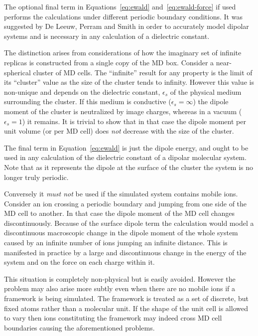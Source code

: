 \documentclass[11pt]{article}
\begin{document}
The optional final term in Equations~\ref{eq:ewald} 
and~\ref{eq:ewald-force} if used performs the calculations under
different periodic boundary conditions.  It was suggested by De Leeuw,
Perram and Smith\cite{} in order to accurately model
dipolar systems and is necessary in any calculation of a dielectric
constant. 

The distinction arises from considerations of how the imaginary set of
infinite replicas is constructed from a single copy of the MD 
box\cite[pp 156-159]{}.  Consider a near-spherical cluster
of MD cells.  The ``infinite'' result for any property is the limit of
its ``cluster'' value as the size of the cluster tends to infinity.
However this value is non-unique and depends on the dielectric
constant, $\epsilon_s$ of the physical medium surrounding the cluster.
If this medium is conductive ($\epsilon_s=\infty$) the dipole
moment of the cluster is neutralized by image charges, whereas in a
vacuum ($\epsilon_s=1$) it remains.  It is trivial to show that
in that case the dipole moment per unit volume (or per MD cell) does
\emph{not} decrease with the size of the cluster.

The final term in Equation~\ref{eq:ewald} is just the dipole energy,
and ought to be used in any calculation of the dielectric constant of
a dipolar molecular system.   Note that as it represents the
dipole at the surface of the cluster the system is no longer truly
periodic.

Conversely it \emph{must not} be used if the simulated system contains
mobile ions.  Consider an ion crossing a periodic boundary and jumping
from one side of the MD cell to another.  In that case the dipole
moment of the MD cell changes discontinuously.   Because of the
surface dipole term the calculation would model a discontinuous
macroscopic change in the dipole moment of the whole system caused by
an infinite number of ions jumping an infinite distance.  This is
manifested in practice by a large and discontinuous change in the
energy of the system and on the force on each charge within it.

This situation is completely non-physical but is easily avoided.
However the problem may also arise more subtly even when there are no
mobile ions if a framework is being simulated.  The framework is treated as a set of
discrete, but fixed atoms rather than a molecular unit.  If the shape
of the unit cell is allowed to vary then ions constituting the
framework may indeed cross MD cell boundaries causing the
aforementioned problems.
\end{document}
